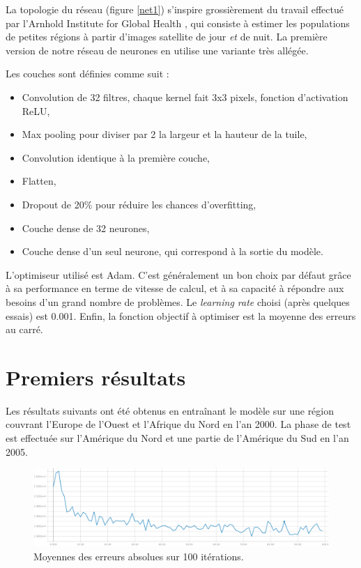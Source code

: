 \documentclass[a4paper, 11pt]{report}
\begin{document}
La topologie du réseau (figure \ref{net1}) s'inspire grossièrement du travail effectué par l'Arnhold Institute for Global Health \cite{netpop-article}, qui consiste à estimer les populations de petites régions à partir d'images satellite de jour \textit{et} de nuit. La première version de notre réseau de neurones en utilise une variante très allégée. 

Les couches sont définies comme suit :
\begin{itemize}
	\item Convolution de 32 filtres, chaque kernel fait 3x3 pixels, fonction d'activation ReLU,
	\item Max pooling pour diviser par 2 la largeur et la hauteur de la tuile,
	\item Convolution identique à la première couche,
	\item Flatten,
	\item Dropout de 20\% pour réduire les chances d'overfitting,
	\item Couche dense de 32 neurones,
	\item Couche dense d'un seul neurone, qui correspond à la sortie du modèle.
\end{itemize}

L'optimiseur utilisé est Adam. C'est généralement un bon choix par défaut grâce à sa performance en terme de vitesse de calcul, et à sa capacité à répondre aux besoins d'un grand nombre de problèmes. Le \textit{learning rate} choisi (après quelques essais) est 0.001. Enfin, la fonction objectif à optimiser est la moyenne des erreurs au carré.

\section{Premiers résultats}

Les résultats suivants ont été obtenus en entraînant le modèle sur une région couvrant l'Europe de l'Ouest et l'Afrique du Nord en l'an 2000. La phase de test est effectuée sur l'Amérique du Nord et une partie de l'Amérique du Sud en l'an 2005.

\begin{figure}
	\centering
	\includegraphics[width=1.0\textwidth]{img/mae1.png}
	\caption{Moyennes des erreurs absolues sur 100 itérations.}
	\label{mae1}
\end{figure}
\end{document}
